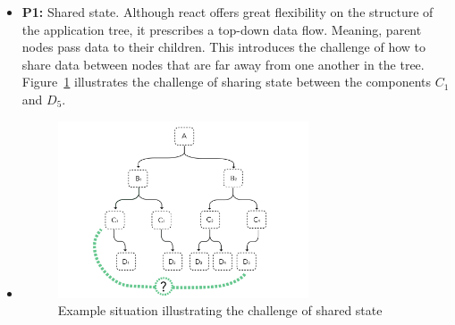 \begin{itemize}
\tightlist
\item
  \textbf{P1:} Shared state. Although react offers great flexibility on
  the structure of the application tree, it prescribes a
  top-down data flow. Meaning, parent nodes pass data to their children.
  This introduces the challenge of how to share data between nodes that
  are far away from one another in the tree. Figure~\ref{image_shared_state}
  illustrates the challenge of sharing state between the components $C_1$ and $D_5$.
\item
\begin{figure}[h!]
    \centering
    \includegraphics[width=0.7\textwidth]{images/share_state}
    \caption{Example situation illustrating the challenge of shared state}
    \label{image_shared_state}
\end{figure}


\end{itemize}
